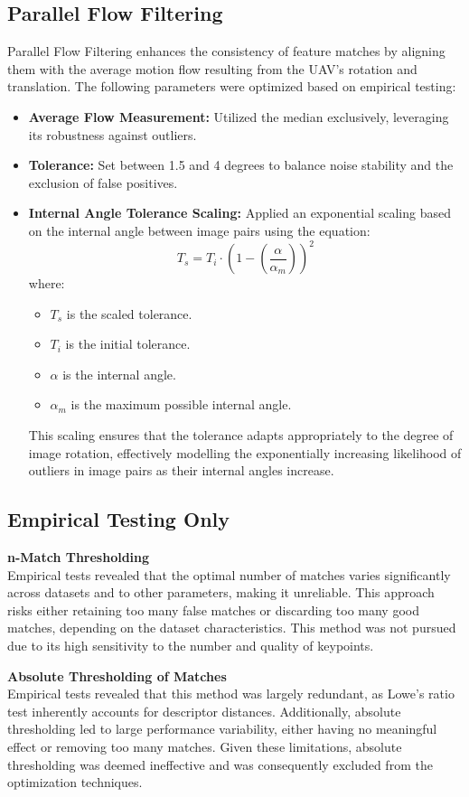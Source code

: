 \subsection{Parallel Flow Filtering}

Parallel Flow Filtering enhances the consistency of feature matches by aligning them with the average motion flow resulting from the UAV's rotation and translation. The following parameters were optimized based on empirical testing:

\begin{itemize}
    \item \textbf{Average Flow Measurement:} Utilized the median exclusively, leveraging its robustness against outliers.
    \item \textbf{Tolerance:} Set between 1.5 and 4 degrees to balance noise stability and the exclusion of false positives.
    \item \textbf{Internal Angle Tolerance Scaling:} Applied an exponential scaling based on the internal angle between image pairs using the equation:
    \begin{equation*}
        T_s = T_i \cdot \left(1 - \left(\frac{\alpha}{\alpha_m}\right)\right)^2
    \end{equation*}
    where:
    \begin{itemize}
        \item $T_s$ is the scaled tolerance.
        \item $T_i$ is the initial tolerance.
        \item $\alpha$ is the internal angle.
        \item $\alpha_m$ is the maximum possible internal angle.
    \end{itemize}
    This scaling ensures that the tolerance adapts appropriately to the degree of image rotation, effectively modelling the exponentially increasing likelihood of outliers in image pairs as their internal angles increase.
\end{itemize}

\subsection*{\textbf{Empirical Testing Only}}

\textbf{n-Match Thresholding} \\
Empirical tests revealed that the optimal number of matches varies significantly across datasets and to other parameters, making it unreliable. This approach risks either retaining too many false matches or discarding too many good matches, depending on the dataset characteristics. This method was not pursued due to its high sensitivity to the number and quality of keypoints. 

\textbf{Absolute Thresholding of Matches} \\
 Empirical tests revealed that this method was largely redundant, as Lowe's ratio test inherently accounts for descriptor distances. Additionally, absolute thresholding led to large performance variability, either having no meaningful effect or removing too many matches. Given these limitations, absolute thresholding was deemed ineffective and was consequently excluded from the optimization techniques.

